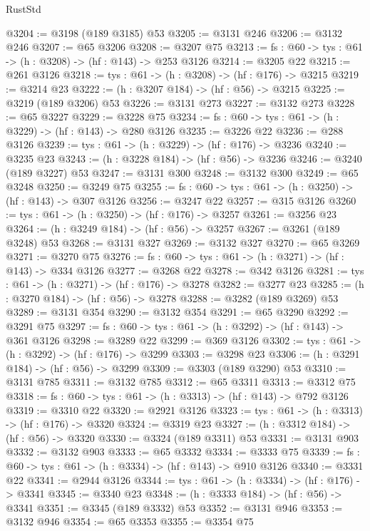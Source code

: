 \begin{lexlean}{RustStd}
\begin{coremodule}
@3204 := @3198 (@189 @3185) @53
@3205 := @3131 @246
@3206 := @3132 @246
@3207 := @65 @3206
@3208 := @3207 @75
@3213 := {fs : @60} -> {tys : @61} -> (h : @3208) -> (hf : @143) -> @253 @3126
@3214 := @3205 @22
@3215 := @261 @3126
@3218 := {tys : @61} -> (h : @3208) -> (hf : @176) -> @3215
@3219 := @3214 @23
@3222 := (h : @3207 @184) -> (hf : @56) -> @3215
@3225 := @3219 (@189 @3206) @53
@3226 := @3131 @273
@3227 := @3132 @273
@3228 := @65 @3227
@3229 := @3228 @75
@3234 := {fs : @60} -> {tys : @61} -> (h : @3229) -> (hf : @143) -> @280 @3126
@3235 := @3226 @22
@3236 := @288 @3126
@3239 := {tys : @61} -> (h : @3229) -> (hf : @176) -> @3236
@3240 := @3235 @23
@3243 := (h : @3228 @184) -> (hf : @56) -> @3236
@3246 := @3240 (@189 @3227) @53
@3247 := @3131 @300
@3248 := @3132 @300
@3249 := @65 @3248
@3250 := @3249 @75
@3255 := {fs : @60} -> {tys : @61} -> (h : @3250) -> (hf : @143) -> @307 @3126
@3256 := @3247 @22
@3257 := @315 @3126
@3260 := {tys : @61} -> (h : @3250) -> (hf : @176) -> @3257
@3261 := @3256 @23
@3264 := (h : @3249 @184) -> (hf : @56) -> @3257
@3267 := @3261 (@189 @3248) @53
@3268 := @3131 @327
@3269 := @3132 @327
@3270 := @65 @3269
@3271 := @3270 @75
@3276 := {fs : @60} -> {tys : @61} -> (h : @3271) -> (hf : @143) -> @334 @3126
@3277 := @3268 @22
@3278 := @342 @3126
@3281 := {tys : @61} -> (h : @3271) -> (hf : @176) -> @3278
@3282 := @3277 @23
@3285 := (h : @3270 @184) -> (hf : @56) -> @3278
@3288 := @3282 (@189 @3269) @53
@3289 := @3131 @354
@3290 := @3132 @354
@3291 := @65 @3290
@3292 := @3291 @75
@3297 := {fs : @60} -> {tys : @61} -> (h : @3292) -> (hf : @143) -> @361 @3126
@3298 := @3289 @22
@3299 := @369 @3126
@3302 := {tys : @61} -> (h : @3292) -> (hf : @176) -> @3299
@3303 := @3298 @23
@3306 := (h : @3291 @184) -> (hf : @56) -> @3299
@3309 := @3303 (@189 @3290) @53
@3310 := @3131 @785
@3311 := @3132 @785
@3312 := @65 @3311
@3313 := @3312 @75
@3318 := {fs : @60} -> {tys : @61} -> (h : @3313) -> (hf : @143) -> @792 @3126
@3319 := @3310 @22
@3320 := @2921 @3126
@3323 := {tys : @61} -> (h : @3313) -> (hf : @176) -> @3320
@3324 := @3319 @23
@3327 := (h : @3312 @184) -> (hf : @56) -> @3320
@3330 := @3324 (@189 @3311) @53
@3331 := @3131 @903
@3332 := @3132 @903
@3333 := @65 @3332
@3334 := @3333 @75
@3339 := {fs : @60} -> {tys : @61} -> (h : @3334) -> (hf : @143) -> @910 @3126
@3340 := @3331 @22
@3341 := @2944 @3126
@3344 := {tys : @61} -> (h : @3334) -> (hf : @176) -> @3341
@3345 := @3340 @23
@3348 := (h : @3333 @184) -> (hf : @56) -> @3341
@3351 := @3345 (@189 @3332) @53
@3352 := @3131 @946
@3353 := @3132 @946
@3354 := @65 @3353
@3355 := @3354 @75

\end{coremodule}
\end{lexlean}
